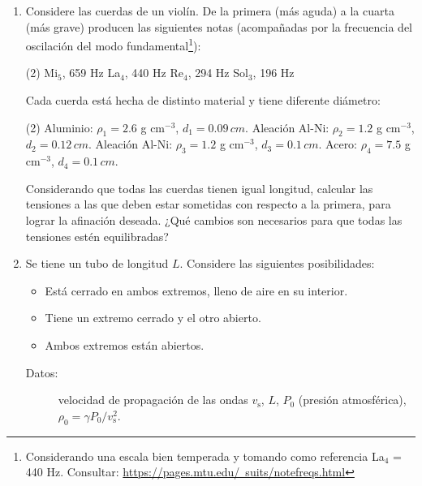 \documentclass[11pt,spanish]{article}
\begin{document}
\begin{enumerate}

    \item Considere las cuerdas de un violín. De la primera (más aguda) a la
    cuarta (más grave) producen las siguientes notas (acompañadas por la
    frecuencia del oscilación del modo fundamental\footnote{Considerando una
    escala bien temperada y tomando como referencia La$_4$ = 440 Hz. Consultar:
    \href{https://pages.mtu.edu/~suits/notefreqs.html}{https://pages.mtu.edu/~suits/notefreqs.html}}):
    \begin{tasks}[style=enumerate](2)
        \task \small Mi$_{\text{5}}$, 659 Hz
        \task \small La$_{\text{4}}$, 440 Hz
        \task \small Re$_{\text{4}}$, 294 Hz
        \task \small Sol$_{\text{3}}$, 196 Hz
    \end{tasks}
    Cada cuerda está hecha de distinto material y tiene diferente diámetro:
    \begin{tasks}[style=enumerate](2)
        \task \small Aluminio: $\rho_1 = 2.6$ g cm$^{-3}$, $d_{1}=0.09\unit{\, cm}$.
        \task \small Aleación Al-Ni: $\rho_2=1.2$ g cm$^{-3}$, $d_{2}=0.12\unit{\, cm}$.
        \task \small Aleación Al-Ni: $\rho_3=1.2$ g cm$^{-3}$, $d_{3}=0.1\unit{\, cm}$.
        \task \small Acero: $\rho_4=7.5$ g cm$^{-3}$, $d_{4}=0.1\unit{\, cm}$.
    \end{tasks}    

    Considerando que todas las cuerdas tienen igual longitud, calcular las
    tensiones a las que deben estar sometidas con respecto a la primera,
    para lograr la afinación deseada. ¿Qué cambios son necesarios para que
    todas las tensiones estén equilibradas?


    \item Se tiene un tubo de longitud $L$. Considere las siguientes
    posibilidades: 

    \begin{itemize}
        \item Está cerrado en ambos extremos, lleno de aire en su interior.
        \item Tiene un extremo cerrado y el otro abierto. 
        \item Ambos extremos están abiertos.
    \end{itemize}

    \begin{description}
        \item [{Datos:}] velocidad de propagación de las ondas $v_\text{s}$,
        $L$, $P_{0}$ (presión atmosférica),
        $\rho_{0}=\gamma P_{0}/v_\text{s}^{2}$.
    \end{description}


\end{enumerate}
\end{document}

